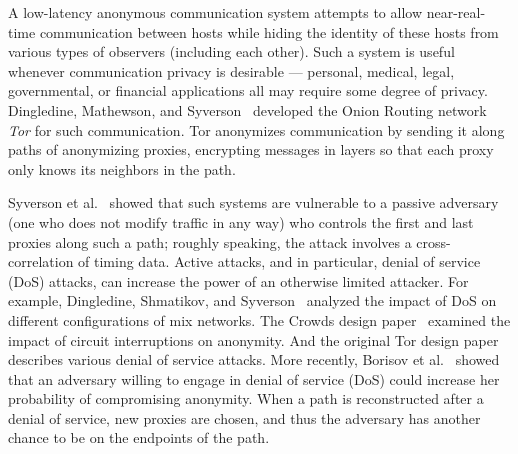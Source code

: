 \documentclass[]{lmcs}
\begin{document}
A low-latency anonymous communication system attempts to allow
near-real-time communication between hosts while hiding the identity
of these hosts from various types of observers (including each
other).  Such a system is
useful whenever communication privacy is desirable --- personal,
medical, legal, governmental, or financial applications all may
require some degree of privacy.  
Dingledine, Mathewson, and Syverson~\citeyearpar{tor-design} developed
the Onion Routing network \emph{Tor} for such
communication.  Tor anonymizes
communication by sending it along paths of anonymizing proxies,
encrypting messages in layers so that each proxy only knows its
neighbors in the path.

Syverson et al.~\citeyearpar{syverson-pet00} showed that such systems are
vulnerable to a passive adversary (one who does not modify traffic
in any way) who controls the first and last
proxies along such a path; roughly speaking, the attack involves a
cross-correlation of timing data.
Active attacks, and in particular, denial of service (DoS) attacks, can
increase the power of an otherwise limited attacker.  For example,
Dingledine, Shmatikov, and Syverson~\citeyearpar{sync-batching} analyzed the impact of DoS on different
configurations of mix networks.  The Crowds design paper~\citet{crowds:tissec}
examined the impact of circuit interruptions on anonymity.  And the
original Tor design paper describes various denial of service attacks.
More recently, Borisov et
al.~\citeyearpar{ccs07-doa} showed that an adversary willing to engage
in denial of service (DoS) could increase her probability of compromising
anonymity.  When a path is reconstructed after a denial of service,
new proxies are chosen, and thus the adversary has another chance to
be on the endpoints of the path.  
\end{document}
